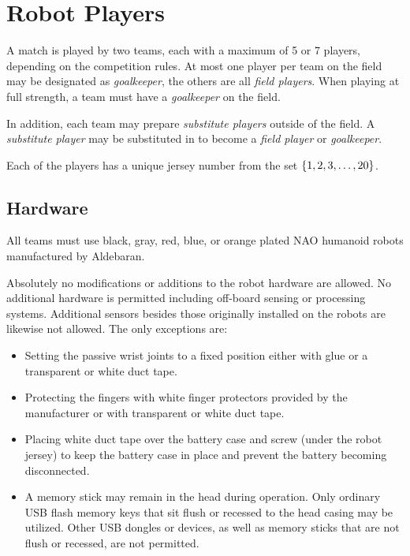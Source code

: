 \section{Robot Players}
\label{sec:robot_players}

A match is played by two teams, each with a maximum of 5 or 7 players, depending on the competition rules.
At most one player per team on the field may be designated as \emph{goalkeeper}, the others are all \emph{field players}.
When playing at full strength, a team must have a \emph{goalkeeper} on the field.

In addition, each team may prepare \emph{substitute players} outside of the field.
A \emph{substitute player} may be substituted in to become a \emph{field player} or \emph{goalkeeper}.

Each of the players has a unique jersey number from the set $\{1, 2, 3, \ldots, 20\}$.

\subsection{Hardware}
\label{sec:hardware}

All teams must use black, gray, red, blue, or orange plated NAO humanoid robots manufactured by Aldebaran.

Absolutely no modifications or additions to the robot hardware are allowed.
No additional hardware is permitted including off-board sensing or processing systems.
Additional sensors besides those originally installed on the robots are likewise not allowed.
The only exceptions are:

\begin{itemize}
  \item Setting the passive wrist joints to a fixed position either with glue or a transparent or white duct tape.
  \item Protecting the fingers with white finger protectors provided by the manufacturer or with transparent or white duct tape.
  \item Placing white duct tape over the battery case and screw (under the robot jersey) to keep the battery case in place and prevent the battery becoming disconnected.
  \item A memory stick may remain in the head during operation.
    Only ordinary USB flash memory keys that sit flush or recessed to the head casing may be utilized.
    Other USB dongles or devices, as well as memory sticks that are not flush or recessed, are not permitted.
\end{itemize}

